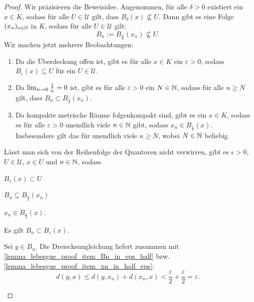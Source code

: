 \begin{proof}
	Wir präzisieren die Beweisidee. Angenommen, für alle \(\delta> 0\) existiert ein \(x\in K\), sodass für alle \(U\in\mathcal{U}\) gilt, dass \(B_\delta (x)\nsubseteq U.\) Dann gibt es eine Folge \((x_n)_{n\in\mathbb{N}}\) in $K$, sodass für alle  \(U\in\mathcal{U}\) gilt: 
	\begin{equation} \label{lemma_lebesgue_proof_eq_notinU}
		B_n:=B_{\frac{1}{n}} (x_n)\nsubseteq U.
	\end{equation}
	Wir machen jetzt mehrere Beobachtungen:
	\begin{enumerate}
		\item Da die Überdeckung offen ist, gibt es für alle \(x\in K\) ein \(\varepsilon>0\), sodass \(B_\varepsilon (x) \subseteq U\) für ein \(U\in\mathcal{U}.\)
		\item Da \(\lim_{n\rightarrow 0} \frac{1}{n}=0\) ist, gibt es für alle \(\varepsilon>0\) ein \(N\in \mathbb{N}\), sodass für alle \(n\geq N\) gilt, dass \(B_n \subset B_\frac{\varepsilon}{2} (x_n)\).
		\item Da kompakte metrische Räume folgenkompakt sind, gibt es ein \(x\in K\),
		 sodass es für alle \(\varepsilon > 0\) unendlich viele \(n\in \mathbb{N}\) gibt, sodass \(x_n\in B_\frac{\varepsilon}{2} (x)\). Insbesondere gilt das für unendlich viele \(n\geq N\), wobei \(N\in\mathbb{N}\) beliebig.
	\end{enumerate}
	Lässt man sich von der Reihenfolge der Quantoren nicht verwirren, gibt es \(\epsilon>0\), \(U\in\mathcal{U}\), \(x\in U\) und \(n\in \mathbb{N}\), sodass
	\begin{center}
		\begin{enumerate*} [itemjoin={, \quad}] 
		\item \label{lemma_lebesgue_proof_item_ball_in_U}\(B_\varepsilon (x)\subset U\)
		\item \label{lemma_lebesgue_proof_item_Bn_in_eps_half}\(B_n\subseteq B_\frac{\varepsilon}{2}(x_n)\)
		\item \label{lemma_lebesgue_proof_item_xn_in_half_eps}\(x_n \in B_\frac{\varepsilon}{2} (x).\)
	\end{enumerate*}
	\end{center}
	
	\begin{claim}
		Es gilt \(B_n\subset B_\varepsilon (x).\)
	\end{claim}
	\begin{proofofclaim}
		Sei \(y\in B_n\). Die Dreiecksungleichung liefert zusammen mit \ref{lemma_lebesgue_proof_item_Bn_in_eps_half} bzw. \ref{lemma_lebesgue_proof_item_xn_in_half_eps}:
		\[d(y,x)\leq d(y,x_n) + d(x_n,x)< \frac{\varepsilon}{2}+\frac{\varepsilon}{2} = \varepsilon.\]
	\end{proofofclaim}


\end{proof}
